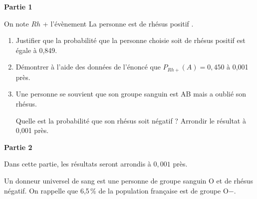 \textbf{Partie 1}

\medskip

On note $Rh$ + l'évènement \og La personne est de rhésus positif \fg.

\begin{enumerate}
\item Justifier que la probabilité que la personne choisie soit de rhésus positif est égale à 0,849.
\item Démontrer à l'aide des données de l'énoncé que $P_{Rh+}(A) = 0,450$ à 0,001 près.
\item Une personne se souvient que son groupe sanguin est AB mais a oublié son rhésus.

Quelle est la probabilité que son rhésus soit négatif ? Arrondir le résultat à 0,001 près.
\end{enumerate}

\bigskip

\textbf{Partie 2}

\medskip

Dans cette partie, les résultats seront arrondis à $0,001$ près.

\medskip

Un donneur universel de sang est une personne de groupe sanguin O et de rhésus négatif. On rappelle que 6,5\,\% de la population française est de groupe O$-$.

\medskip


